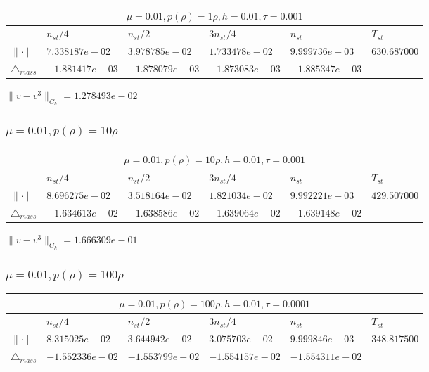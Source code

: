 \begin{tabular}{*{6}{|l}|}
    \hline
     \\
    \hline
    &$n_{st}/4 $&$ n_{st}/2$&$3n_{st}/4$&$n_{st}$&$T_{st}$ \\
    \hline
$\|\cdot \|$& $7.338187e-02$ & $3.978785e-02$ & $1.733478e-02$ & $9.999736e-03$ &$630.687000$\\
\hline
$\triangle_{mass}$& $-1.881417e-03$ & $-1.878079e-03$ & $-1.873083e-03$ & $-1.885347e-03$ &\\
\hline
\end{tabular}

$\|v-v^{3}\|_{C_h} = 1.278493e-02$

\subsubsection{$\mu = 0.01, p(\rho) = 10\rho $}

\begin{tabular}{*{6}{|l}|}
    \hline
     \\
    \hline
    &$n_{st}/4 $&$ n_{st}/2$&$3n_{st}/4$&$n_{st}$&$T_{st}$ \\
    \hline
    $\|\cdot \|$& $8.696275e-02$ & $3.518164e-02$ & $1.821034e-02$ & $9.992221e-03$ &$429.507000$\\
\hline
$\triangle_{mass}$& $-1.634613e-02$ & $-1.638586e-02$ & $-1.639064e-02$ & $-1.639148e-02$ &\\
\hline
\end{tabular}

$\|v-v^{3}\|_{C_h} = 1.666309e-01$

\subsubsection{$\mu = 0.01, p(\rho) = 100\rho $}

\begin{tabular}{*{6}{|l}|}
    \hline
     \\
    \hline
    &$n_{st}/4 $&$ n_{st}/2$&$3n_{st}/4$&$n_{st}$&$T_{st}$ \\
    \hline
$\|\cdot \|$& $8.315025e-02$ & $3.644942e-02$ & $3.075703e-02$ & $9.999846e-03$ &$348.817500$\\
\hline
$\triangle_{mass}$& $-1.552336e-02$ & $-1.553799e-02$ & $-1.554157e-02$ & $-1.554311e-02$ &\\
\hline
\end{tabular}

